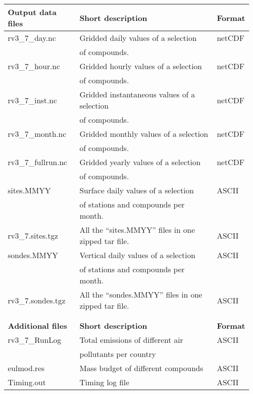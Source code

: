 \begin{table}
\hspace{-1cm}
\begin{tabular}{lll}
\hline\hline
{\bf Output data files} &  {\bf Short description} & {\bf Format}\\
\hline\hline
    rv3\_7\_day.nc & Gridded daily values of a selection & netCDF\\
&   of compounds.& \\ \hline
    rv3\_7\_hour.nc &Gridded hourly values of a selection &
    netCDF\\  
 &  of compounds.& \\\hline
    rv3\_7\_inst.nc &Gridded instantaneous values of a selection
     & netCDF\\
 &  of compounds.& \\\hline
    rv3\_7\_month.nc & Gridded monthly values of a selection&
    netCDF\\
 &  of compounds.& \\\hline
    rv3\_7\_fullrun.nc & Gridded yearly values of a selection&
    netCDF\\
 &  of compounds. & \\\hline
    sites.MMYY & Surface daily values of a selection&  ASCII\\
 & of stations and compounds per month.& \\\hline
    rv3\_7.sites.tgz & All the ``sites.MMYY'' files in one zipped tar file. & ASCII\\\hline
    sondes.MMYY & Vertical daily values of a selection& ASCII\\
 &  of stations and compounds per month.& \\\hline
    rv3\_7.sondes.tgz& All the ``sondes.MMYY'' files in one zipped tar file.&
    ASCII\\ 
& &\\ 
& &\\ \hline\hline
{\bf Additional files} &  {\bf Short description} & {\bf Format}\\
\hline\hline
    rv3\_7\_RunLog & Total emissions of different air   & ASCII\\
 & pollutants per country& \\\hline
eulmod.res & Mass budget of different compounds & ASCII\\\hline
Timing.out & Timing log file& ASCII \\\hline
 
\hline
\end{tabular}

\label{Tab:outputs}
\end{table}



